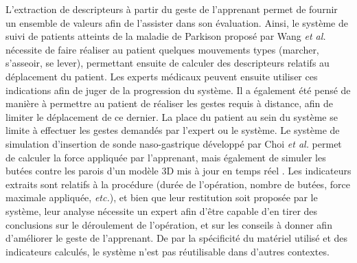 L'extraction de descripteurs à partir du geste de l'apprenant permet de fournir un ensemble de valeurs afin de l'assister dans son évaluation. Ainsi, le système de suivi de patients atteints de la maladie de Parkison proposé par Wang \textit{et al.} nécessite de faire réaliser au patient quelques mouvements types (marcher, s'asseoir, se lever), permettant ensuite de calculer des descripteurs relatifs au déplacement du patient. Les experts médicaux peuvent ensuite utiliser ces indications afin de juger de la progression du système. Il a également été pensé de manière à permettre au patient de réaliser les gestes requis à distance, afin de limiter le déplacement de ce dernier. La place du patient au sein du système se limite à effectuer les gestes demandés par l'expert ou le système. Le système de simulation d'insertion de sonde naso-gastrique développé par Choi \textit{et al.} permet de calculer la force appliquée par l'apprenant, mais également de simuler les butées contre les parois d'un modèle 3D mis à jour en temps réel \parencite{Choi2015103}. Les indicateurs extraits sont relatifs à la procédure (durée de l'opération, nombre de butées, force maximale appliquée, \textit{etc.}), et bien que leur restitution soit proposée par le système, leur analyse nécessite un expert afin d'être capable d'en tirer des conclusions sur le déroulement de l'opération, et sur les conseils à donner afin d'améliorer le geste de l'apprenant. De par la spécificité du matériel utilisé et des indicateurs calculés, le système n'est pas réutilisable dans d'autres contextes.
